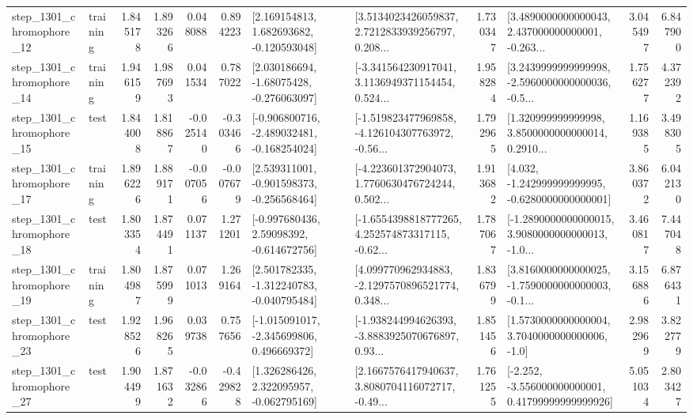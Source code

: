 \begin{tabular}{llrrrrllrlrr}
 step\_1301\_chromophore\_12 &  training &      1.845178 &    1.893266 &      0.048088 &  0.894223 &    [2.169154813, 1.682693682, -0.120593048] &  [3.5134023426059837, 2.7212833939256797, 0.208... &       1.730347 &  [3.4890000000000043, 2.437000000000001, -0.263... &            3.045497 &          6.847900 \\
 step\_1301\_chromophore\_14 &  training &      1.946159 &    1.987693 &      0.041534 &  0.787022 &    [2.030186694, -1.68075428, -0.276063097] &  [-3.341564230917041, 3.1136949371154454, 0.524... &       1.958284 &  [3.2439999999999998, -2.5960000000000036, -0.5... &            1.756277 &          4.372392 \\
 step\_1301\_chromophore\_15 &      test &      1.844008 &    1.818867 &     -0.025140 & -0.303466 &  [-0.906800716, -2.489032481, -0.168254024] &  [-1.519823477969858, -4.126104307763972, -0.56... &       1.792965 &  [1.320999999999998, 3.8500000000000014, 0.2910... &            1.169385 &          3.498305 \\
 step\_1301\_chromophore\_17 &  training &      1.896226 &    1.889171 &     -0.007056 & -0.007679 &   [2.539311001, -0.901598373, -0.256568464] &  [-4.223601372904073, 1.7760630476724244, 0.502... &       1.913682 &   [4.032, -1.242999999999995, -0.6280000000000001] &            3.860372 &          6.042130 \\
 step\_1301\_chromophore\_18 &      test &      1.803354 &    1.874491 &      0.071137 &  1.271201 &    [-0.997680436, 2.59098392, -0.614672756] &  [-1.6554398818777265, 4.252574873317115, -0.62... &       1.787067 &  [-1.2890000000000015, 3.9080000000000013, -1.0... &            3.460817 &          7.447048 \\
 step\_1301\_chromophore\_19 &  training &      1.804987 &    1.875999 &      0.071013 &  1.269164 &   [2.501782335, -1.312240783, -0.040795484] &  [4.099770962934883, -2.1297570896521774, 0.348... &       1.836799 &  [3.8160000000000025, -1.7590000000000003, -0.1... &            3.156886 &          6.876431 \\
 step\_1301\_chromophore\_23 &      test &      1.928526 &    1.968265 &      0.039738 &  0.757656 &   [-1.015091017, -2.345699806, 0.496669372] &  [-1.938244994626393, -3.8883925070676897, 0.93... &       1.851456 &     [1.5730000000000004, 3.7040000000000006, -1.0] &            2.982969 &          3.822779 \\
 step\_1301\_chromophore\_27 &      test &      1.904499 &    1.871632 &     -0.032866 & -0.429828 &    [1.326286426, 2.322095957, -0.062795169] &  [2.1667576417940637, 3.8080704116072717, -0.49... &       1.761255 &  [-2.252, -3.556000000000001, 0.41799999999999926] &            5.051034 &          2.803427 \\

\end{tabular}
